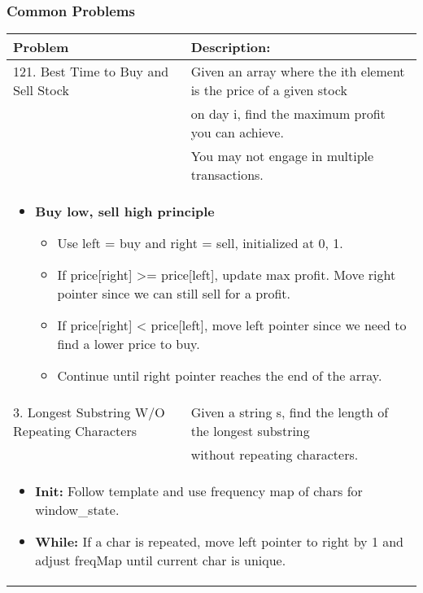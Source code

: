 \subsubsection{Common Problems}
\begin{summary}
    \begin{center}
        \begin{tabular}{ll}
            \toprule
            \textbf{Problem} & \textbf{Description:} \\
            \midrule
            121. Best Time to Buy and Sell Stock & Given an array where the ith element is the price of a given stock \\ 
            & on day i, find the maximum profit you can achieve. \\ 
            & You may not engage in multiple transactions. \\
            \multicolumn{2}{p{\linewidth}}{
                \begin{itemize}
                    \item \textbf{Buy low, sell high principle}
                    \begin{itemize}
                        \item Use left = buy and right = sell, initialized at 0, 1. 
                        \item If price[right] >= price[left], update max profit. Move right pointer since we can still sell for a profit.
                        \item If price[right] < price[left], move left pointer since we need to find a lower price to buy.
                        \item Continue until right pointer reaches the end of the array.
                    \end{itemize}
                \end{itemize}
            } \\
            \midrule
            3. Longest Substring W/O Repeating Characters & Given a string s, find the length of the longest substring \\
            & without repeating characters. \\
            \multicolumn{2}{p{\linewidth}}{
                \begin{itemize}
                    \item \textbf{Init:} Follow template and use frequency map of chars for window\_state.
                    \item \textbf{While:} If a char is repeated, move left pointer to right by 1 and adjust freqMap until current char is unique. 

\end{itemize}}
\end{tabular}
\end{center}
\end{summary}
